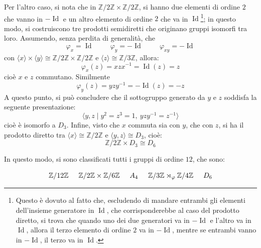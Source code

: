 \documentclass[11pt]{article}
\theoremstyle{style}
\newenvironment{boxenv}[1][]{
    \begin{eqbox}[#1]
    }{
   \end{eqbox}
}
\numberwithin{equation}{subsection}
\begin{document}
\begin{itemize}
		Per l'altro caso, si nota che in $\mathbb{Z}/2\mathbb{Z}\times \mathbb{Z}/2\mathbb{Z}$, si hanno due elementi di ordine $2$ che vanno in $-\operatorname{Id} $ e un altro elemento di ordine $2$ che va in $\operatorname{Id} $\footnote{Questo \`e dovuto al fatto che, escludendo di mandare entrambi gli elementi dell'insieme generatore in $\operatorname{Id} $, che corrisponderebbe al caso del prodotto diretto, si trova che quando uno dei due generatori va in $-\operatorname{Id} $ e l'altro va in $\operatorname{Id} $, allora il terzo elemento di ordine $2$ va in $-\operatorname{Id} $, mentre se entrambi vanno in $-\operatorname{Id} $, il terzo va in $\operatorname{Id} $.}; in questo modo, si costruiscono tre prodotti semidiretti che originano gruppi isomorfi tra loro.
Assumendo, senza perdita di generalit\`a, che 
\[
\varphi _x = \operatorname{Id} \hspace{1cm} \varphi _y = -\operatorname{Id} \hspace{1cm} \varphi _{xy} = - \operatorname{Id} 
\] 
con $\langle x \rangle\times \langle y \rangle\cong \mathbb{Z}/2\mathbb{Z}\times \mathbb{Z}/2\mathbb{Z}$ e $\langle z \rangle\cong \mathbb{Z}/3\mathbb{Z}$, allora:
\[
\varphi _x (z) = x z x^{-1} = \operatorname{Id} (z) = z 
\] 
cio\`e $x $ e $z$ commutano.
Similmente
\[
\varphi _y (z) =yzy^{-1} =- \operatorname{Id} (z) = - z
\] 
A questo punto, si pu\`o concludere che il sottogruppo generato da $y $ e $z$ soddisfa la seguente presentazione:
\[
\langle y,z  \mid y^2 = z^3 = 1 , \ yzy^{-1} = z^{-1}\rangle
\] 
cio\`e \`e isomorfo a $D_3$.
Infine, visto che $x$ commuta sia con $y$, che con $z$, si ha il prodotto diretto tra $\langle x \rangle \cong \mathbb{Z}/2\mathbb{Z}$ e $\langle y,z \rangle\cong D_3$, cio\`e:
\[
\mathbb{Z}/2\mathbb{Z}\times D_3 \cong D_6
\] 
\end{itemize}
In questo modo, si sono classificati tutti i gruppi di ordine $12$, che sono:
\begin{boxenv}[]
\[
\mathbb{Z}/12\mathbb{Z} \hspace{.5cm} \mathbb{Z}/2\mathbb{Z} \times \mathbb{Z}/6\mathbb{Z} \hspace{.5cm} A_4 \hspace{.5cm} \mathbb{Z}/3\mathbb{Z} \rtimes _\varphi \mathbb{Z}/4\mathbb{Z} \hspace{.5cm} D_6
\] 
\end{boxenv}
\end{document}
